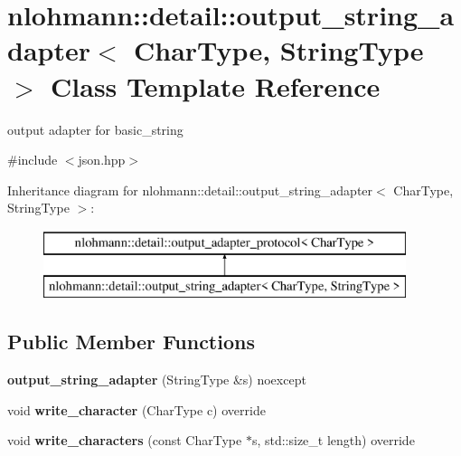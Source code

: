 \hypertarget{classnlohmann_1_1detail_1_1output__string__adapter}{}\section{nlohmann\+:\+:detail\+:\+:output\+\_\+string\+\_\+adapter$<$ Char\+Type, String\+Type $>$ Class Template Reference}
\label{classnlohmann_1_1detail_1_1output__string__adapter}


output adapter for basic\+\_\+string  




{\ttfamily \#include $<$json.\+hpp$>$}

Inheritance diagram for nlohmann\+:\+:detail\+:\+:output\+\_\+string\+\_\+adapter$<$ Char\+Type, String\+Type $>$\+:\begin{figure}[H]
\begin{center}
\leavevmode
\includegraphics[height=2.000000cm]{classnlohmann_1_1detail_1_1output__string__adapter}
\end{center}
\end{figure}
\subsection*{Public Member Functions}
\begin{DoxyCompactItemize}
\item 
\mbox{\label{classnlohmann_1_1detail_1_1output__string__adapter_af3a49ecd0d23fe56ac21e13d8752abc7}} 
{\bfseries output\+\_\+string\+\_\+adapter} (String\+Type \&s) noexcept
\item 
\mbox{\label{classnlohmann_1_1detail_1_1output__string__adapter_a2d76cc6c88ddbc196a63fcfcac9ee7d1}} 
void {\bfseries write\+\_\+character} (Char\+Type c) override
\item 
\mbox{\label{classnlohmann_1_1detail_1_1output__string__adapter_ab5ea4da075305d225dfd84ad997e8747}} 
void {\bfseries write\+\_\+characters} (const Char\+Type $\ast$s, std\+::size\+\_\+t length) override
\end{DoxyCompactItemize}


